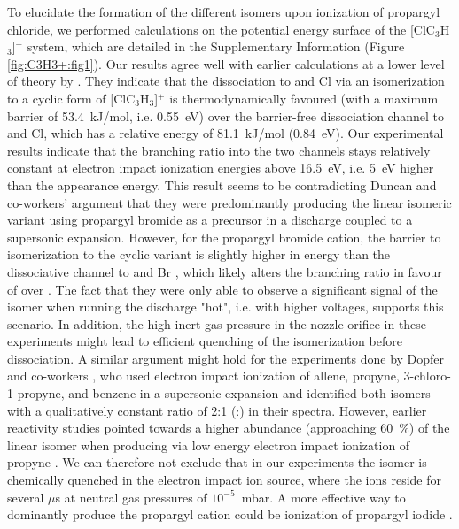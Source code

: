 To elucidate the formation of the different isomers upon ionization of propargyl chloride, we performed calculations on the potential energy surface of the [ClC$_3$H$_3$]$^+$ system, which are detailed in the Supplementary Information (Figure \ref{fig:C3H3+:fig1}). Our results agree well with earlier calculations at a lower level of theory by \citet{WCK2000}. They indicate that the dissociation to \cyc and Cl via an isomerization to a cyclic form of [ClC$_3$H$_3$]$^+$ is thermodynamically favoured (with a maximum barrier of 53.4~kJ/mol, i.e. 0.55~eV) over the barrier-free dissociation channel to \lin and Cl, which has a relative energy of 81.1~kJ/mol (0.84~eV). Our experimental results indicate that the branching ratio into the two channels stays relatively constant at electron impact ionization energies above 16.5~eV, i.e. 5~eV higher than the \lin appearance energy. This result seems to be contradicting Duncan and co-workers' \citep{RDS2010,Duncan2012} argument that they were predominantly producing the linear isomeric variant using propargyl bromide as a precursor in a discharge coupled to a supersonic expansion. However, for the propargyl bromide cation, the barrier to isomerization to the cyclic variant is slightly higher in energy than the dissociative channel to \lin and Br \citep{KCK1999}, which likely alters the branching ratio in favour of \lin over \cyc. The fact that they were only able to observe a significant signal of the \cyc isomer when running the discharge "hot", i.e. with higher voltages, supports this scenario. In addition, the high inert gas pressure in the nozzle orifice in these experiments might lead to efficient quenching of the isomerization before dissociation. A similar argument might hold for the experiments done by Dopfer and co-workers \citep{DRM2002}, who used electron impact ionization of allene, propyne, 3-chloro-1-propyne, and benzene in a supersonic expansion and identified both \iso isomers with a qualitatively constant ratio of 2:1 (\cyc:\lin) in their spectra. However, earlier reactivity studies pointed towards a higher abundance (approaching 60~\%) of the linear isomer when producing \iso via low energy electron impact ionization of propyne \citep{MMF1994}. We can therefore not exclude that in our experiments the \lin isomer is chemically quenched in the electron impact ion source, where the ions reside for several $\mu$s at neutral gas pressures of $10^{-5}$~mbar. A more effective way to dominantly produce the propargyl cation could be ionization of propargyl iodide \citep{HL1978}.\\

